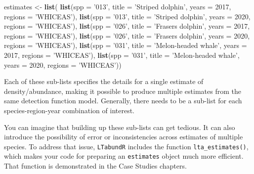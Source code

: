 \documentclass[
]{book}
\newenvironment{Shaded}{\begin{snugshade}}{\end{snugshade}}
\newcommand{\DataTypeTok}[1]{\textcolor[rgb]{0.13,0.29,0.53}{#1}}
\newcommand{\DecValTok}[1]{\textcolor[rgb]{0.00,0.00,0.81}{#1}}
\newcommand{\KeywordTok}[1]{\textcolor[rgb]{0.13,0.29,0.53}{\textbf{#1}}}
\newcommand{\NormalTok}[1]{#1}
\newcommand{\StringTok}[1]{\textcolor[rgb]{0.31,0.60,0.02}{#1}}
\begin{document}
\begin{Shaded}
\begin{Highlighting}[]
\NormalTok{estimates <-}\StringTok{ }\KeywordTok{list}\NormalTok{(}
    \KeywordTok{list}\NormalTok{(}\DataTypeTok{spp =} \StringTok{'013'}\NormalTok{,}
         \DataTypeTok{title =} \StringTok{'Striped dolphin'}\NormalTok{,}
         \DataTypeTok{years =} \DecValTok{2017}\NormalTok{,}
         \DataTypeTok{regions =} \StringTok{'WHICEAS'}\NormalTok{),}
    \KeywordTok{list}\NormalTok{(}\DataTypeTok{spp =} \StringTok{'013'}\NormalTok{,}
         \DataTypeTok{title =} \StringTok{'Striped dolphin'}\NormalTok{,}
         \DataTypeTok{years =} \DecValTok{2020}\NormalTok{,}
         \DataTypeTok{regions =} \StringTok{'WHICEAS'}\NormalTok{),}
    \KeywordTok{list}\NormalTok{(}\DataTypeTok{spp =} \StringTok{'026'}\NormalTok{,}
         \DataTypeTok{title =} \StringTok{'Frasers dolphin'}\NormalTok{,}
         \DataTypeTok{years =} \DecValTok{2017}\NormalTok{,}
         \DataTypeTok{regions =} \StringTok{'WHICEAS'}\NormalTok{),}
    \KeywordTok{list}\NormalTok{(}\DataTypeTok{spp =} \StringTok{'026'}\NormalTok{,}
         \DataTypeTok{title =} \StringTok{'Frasers dolphin'}\NormalTok{,}
         \DataTypeTok{years =} \DecValTok{2020}\NormalTok{,}
         \DataTypeTok{regions =} \StringTok{'WHICEAS'}\NormalTok{),}
    \KeywordTok{list}\NormalTok{(}\DataTypeTok{spp =} \StringTok{'031'}\NormalTok{,}
         \DataTypeTok{title =} \StringTok{'Melon-headed whale'}\NormalTok{,}
         \DataTypeTok{years =} \DecValTok{2017}\NormalTok{,}
         \DataTypeTok{regions =} \StringTok{'WHICEAS'}\NormalTok{),}
    \KeywordTok{list}\NormalTok{(}\DataTypeTok{spp =} \StringTok{'031'}\NormalTok{,}
         \DataTypeTok{title =} \StringTok{'Melon-headed whale'}\NormalTok{,}
         \DataTypeTok{years =} \DecValTok{2020}\NormalTok{,}
         \DataTypeTok{regions =} \StringTok{'WHICEAS'}\NormalTok{))}
\end{Highlighting}
\end{Shaded}

Each of these sub-lists specifies the details for a single estimate of density/abundance, making it possible to produce multiple estimates from the same detection function model. Generally, there needs to be a sub-list for each species-region-year combination of interest.

You can imagine that building up these sub-lists can get tedious. It can also introduce the possibility of error or inconsistencies across estimates of multiple species. To address that issue, \texttt{LTabundR} includes the function \texttt{lta\_estimates()}, which makes your code for preparing an \texttt{estimates} object much more efficient. That function is demonstrated in the Case Studies chapters.
\end{document}
